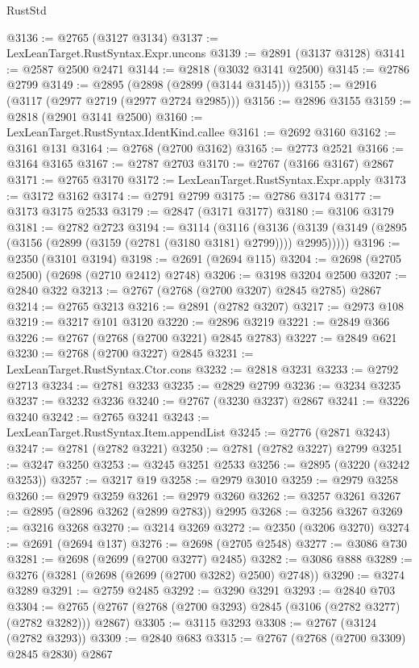 \begin{lexlean}{RustStd}
\begin{coremodule}
@3136 := @2765 (@3127 @3134)
@3137 := LexLeanTarget.RustSyntax.Expr.uncons
@3139 := @2891 (@3137 @3128)
@3141 := @2587 @2500 @2471
@3144 := @2818 (@3032 @3141 @2500)
@3145 := @2786 @2799
@3149 := @2895 (@2898 (@2899 (@3144 @3145)))
@3155 := @2916 (@3117 (@2977 @2719 (@2977 @2724 @2985)))
@3156 := @2896 @3155
@3159 := @2818 (@2901 @3141 @2500)
@3160 := LexLeanTarget.RustSyntax.IdentKind.callee
@3161 := @2692 @3160
@3162 := @3161 @131
@3164 := @2768 (@2700 @3162)
@3165 := @2773 @2521
@3166 := @3164 @3165
@3167 := @2787 @2703
@3170 := @2767 (@3166 @3167) @2867
@3171 := @2765 @3170
@3172 := LexLeanTarget.RustSyntax.Expr.apply
@3173 := @3172 @3162
@3174 := @2791 @2799
@3175 := @2786 @3174
@3177 := @3173 @3175 @2533
@3179 := @2847 (@3171 @3177)
@3180 := @3106 @3179
@3181 := @2782 @2723
@3194 := @3114
    (@3116
      (@3136 (@3139 (@3149 (@2895 (@3156 (@2899 (@3159 (@2781 (@3180 @3181) @2799)))) @2995)))))
@3196 := @2350 (@3101 @3194)
@3198 := @2691 (@2694 @115)
@3204 := @2698 (@2705 @2500) (@2698 (@2710 @2412) @2748)
@3206 := @3198 @3204 @2500
@3207 := @2840 @322
@3213 := @2767 (@2768 (@2700 @3207) @2845 @2785) @2867
@3214 := @2765 @3213
@3216 := @2891 (@2782 @3207)
@3217 := @2973 @108
@3219 := @3217 @101 @3120
@3220 := @2896 @3219
@3221 := @2849 @366
@3226 := @2767 (@2768 (@2700 @3221) @2845 @2783)
@3227 := @2849 @621
@3230 := @2768 (@2700 @3227) @2845
@3231 := LexLeanTarget.RustSyntax.Ctor.cons
@3232 := @2818 @3231
@3233 := @2792 @2713
@3234 := @2781 @3233
@3235 := @2829 @2799
@3236 := @3234 @3235
@3237 := @3232 @3236
@3240 := @2767 (@3230 @3237) @2867
@3241 := @3226 @3240
@3242 := @2765 @3241
@3243 := LexLeanTarget.RustSyntax.Item.appendList
@3245 := @2776 (@2871 @3243)
@3247 := @2781 (@2782 @3221)
@3250 := @2781 (@2782 @3227) @2799
@3251 := @3247 @3250
@3253 := @3245 @3251 @2533
@3256 := @2895 (@3220 (@3242 @3253))
@3257 := @3217 @19
@3258 := @2979 @3010
@3259 := @2979 @3258
@3260 := @2979 @3259
@3261 := @2979 @3260
@3262 := @3257 @3261
@3267 := @2895 (@2896 @3262 (@2899 @2783)) @2995
@3268 := @3256 @3267
@3269 := @3216 @3268
@3270 := @3214 @3269
@3272 := @2350 (@3206 @3270)
@3274 := @2691 (@2694 @137)
@3276 := @2698 (@2705 @2548)
@3277 := @3086 @730
@3281 := @2698 (@2699 (@2700 @3277) @2485)
@3282 := @3086 @888
@3289 := @3276 (@3281 (@2698 (@2699 (@2700 @3282) @2500) @2748))
@3290 := @3274 @3289
@3291 := @2759 @2485
@3292 := @3290 @3291
@3293 := @2840 @703
@3304 := @2765 (@2767 (@2768 (@2700 @3293) @2845 (@3106 (@2782 @3277) (@2782 @3282))) @2867)
@3305 := @3115 @3293
@3308 := @2767 (@3124 (@2782 @3293))
@3309 := @2840 @683
@3315 := @2767 (@2768 (@2700 @3309) @2845 @2830) @2867

\end{coremodule}
\end{lexlean}
